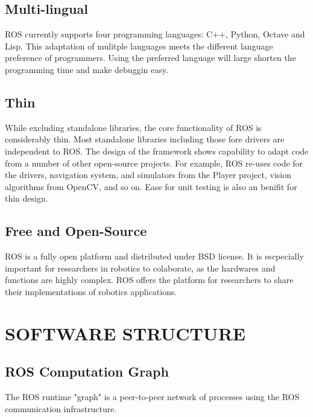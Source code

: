 \documentclass[a4paper, 11pt, conference]{ieeeconf}       %
\begin{document}
\subsection{Multi-lingual}

ROS currently supports four programming languages: C++, Python, Octave and Lisp. This adaptation of mulitple languages meets the different language preference of programmers. Using the preferred language will large shorten the programming time and make debuggin easy.

\subsection{Thin}

While excluding standalone libraries, the core functionality of ROS is considerably thin. Most standalone libraries including those fore drivers are independent to ROS. The design of the framework shows capability to adapt code from a number of other open-source projects. For example, ROS re-uses code for the drivers, navigation system, and simulators from the Player project, vision algorithms from OpenCV, and so on. Ease for unit testing is also an benifit for thin design.

\subsection{Free and Open-Source}

ROS is a fully open platform and distributed under BSD license. It is escpecially important for researchers in robotics to colaborate, as the hardwares and functions are highly complex. ROS offers the platform for researchers to share their implementations of robotics applications.

\section{SOFTWARE STRUCTURE}

\subsection{ROS Computation Graph}
The ROS runtime "graph" is a peer-to-peer network of processes using the ROS communication infrastructure.
\end{document}
